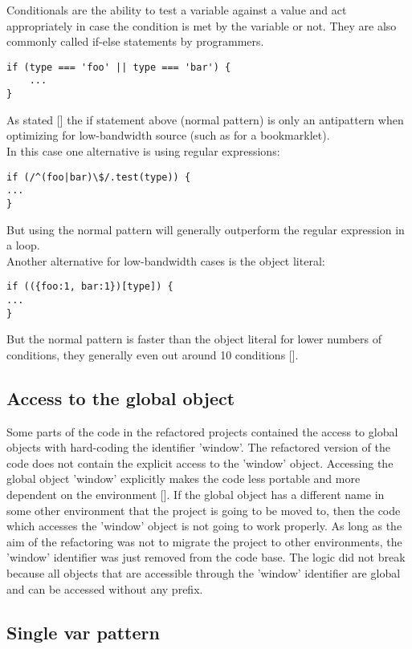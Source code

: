 \documentclass{bioinfo}
\begin{document}
\begin{methods}
Conditionals are the ability to test a variable against a value and act appropriately in case the condition is met by the variable or not. They are also commonly called if-else statements by programmers.
\begin{lstlisting}
if (type === 'foo' || type === 'bar') {
    ...
}
\end{lstlisting}
As stated [\citealp{irish02}] the if statement above (normal pattern) is only an antipattern when optimizing for low-bandwidth source (such as for a bookmarklet).\\
In this case one alternative is using regular expressions:
\begin{lstlisting}
if (/^(foo|bar)\$/.test(type)) {
...
}
\end{lstlisting}
But using the normal pattern will generally outperform the regular expression in a loop.\\[0.2cm]
Another alternative for low-bandwidth cases is the object literal:
\begin{lstlisting}
if (({foo:1, bar:1})[type]) {
...
}
\end{lstlisting}
But the normal pattern is faster than the object literal for lower numbers of conditions, they generally even out around 10 conditions [\citealp{bynens}]. 


\subsection{Access to the global object}

Some parts of the code in the refactored projects contained the access to global objects with hard-coding the identifier 'window'. The refactored version of the code does not contain the explicit access to the 'window' object. Accessing the global object 'window' explicitly makes the code less portable and more dependent on the environment [\citealp{stoyan02}]. If the global object has a different name in some other environment that the project is going to be moved to, then the code which accesses the 'window' object is not going to work properly. As long as the aim of the refactoring was not to migrate the project to other environments, the 'window' identifier was just removed from the code base. The logic did not break because all objects that are accessible through the 'window' identifier are global and can be accessed without any prefix.

\subsection{Single var pattern}


\end{methods}
\end{document}
